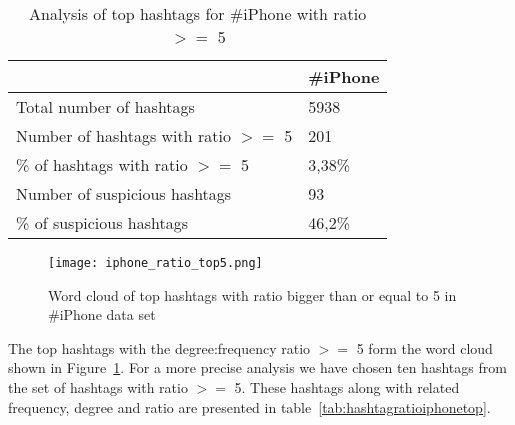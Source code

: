\documentclass[journal, a4paper, 12pt]{article}
\begin{document}
     \begin{table}[!hbt]
            \begin{center}
            \caption{Analysis of top hashtags for \#iPhone with ratio $>=$ 5}
            \label{tab:hashtagratioiphone}
            \begin{tabular}{|p{5cm}|p{3cm}|}
                  \hline
                   & \#iPhone \\
            \hline
                  Total number of hashtags & 5938 \\
                  \hline
                  Number of hashtags with ratio $>=$ 5 & 201 \\
                  \hline
                  \% of hashtags with ratio $>=$ 5 & 3,38\% \\
            \hline
            Number of suspicious hashtags & 93 \\
                  \hline
            \% of suspicious hashtags & 46,2\% \\
                  \hline
            \end{tabular}
            \end{center}
      \end{table}
    
    
     \begin{figure}[!hbt]
            \begin{center}
            \texttt{[image: iphone\_ratio\_top5.png]}
            \caption{Word cloud of top hashtags with ratio bigger than or equal to 5 in \#iPhone data set}
            \label{fig:word_iphone}
            \end{center}
      \end{figure}
    
    
The top hashtags with the degree:frequency ratio $>=$ 5 form the word cloud shown in Figure~\ref{fig:word_iphone}. For a more precise analysis we have chosen ten hashtags from the set of hashtags with ratio $>=$ 5. These hashtags along with related frequency, degree and ratio are presented in table~\ref{tab:hashtagratioiphonetop}.
\\
\end{document}
